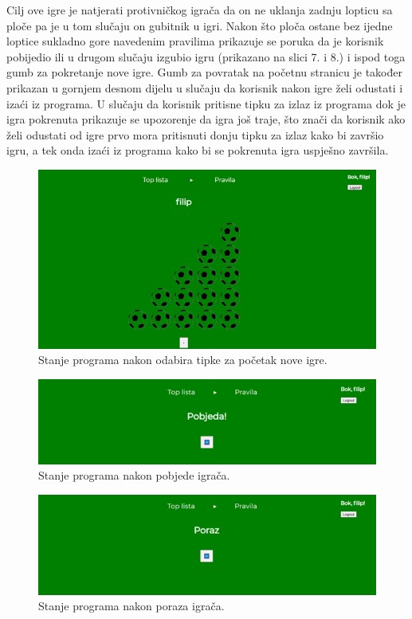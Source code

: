  Cilj ove igre je natjerati protivničkog igrača da on ne uklanja zadnju lopticu sa ploče pa je u tom slučaju on gubitnik u igri. Nakon što ploča ostane bez ijedne loptice sukladno gore navedenim pravilima prikazuje se poruka da je korisnik pobijedio ili u drugom slučaju izgubio igru (prikazano na slici 7. i 8.) i ispod toga gumb za pokretanje nove igre. Gumb za povratak na početnu stranicu je također prikazan u gornjem desnom dijelu u slučaju da korisnik nakon igre želi odustati i izaći iz programa. U slučaju da korisnik pritisne tipku za izlaz iz programa dok je igra pokrenuta prikazuje se upozorenje da igra još traje, što znači da korisnik ako želi odustati od igre prvo mora pritisnuti donju tipku za izlaz kako bi završio igru, a tek onda izaći iz programa kako bi se pokrenuta igra uspješno završila.


\begin{figure}[H]
\centering
\includegraphics[width=14cm]{slike-program/Slika6.png}
\caption{Stanje programa nakon odabira tipke za početak nove igre.}
\label{}
\end{figure}

\begin{figure}[H]
\centering
\includegraphics[width=14cm]{slike-program/Slika7.png}
\caption{Stanje programa nakon pobjede igrača.}
\label{}
\end{figure}

\begin{figure}[H]
\centering
\includegraphics[width=14cm]{slike-program/Slika8.png}
\caption{Stanje programa nakon poraza igrača.}
\label{}
\end{figure}
